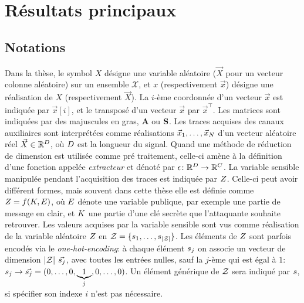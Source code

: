 \section{R\'{e}sultats principaux}\label{sec:res}

\subsection{Notations}
Dans la th\`{e}se, le symbol $X$ d\'{e}signe une variable al\'{e}atoire ($\vec{X}$ pour un vecteur colonne al\'{e}atoire) sur un ensemble $\mathcal{X}$, et $x$ (respectivement $\vec{x}$) d\'{e}signe une r\'{e}alisation de $X$ (respectivement $\vec{X}$). 
La $i$-\`{e}me coordonn\'{e}e d'un vecteur $\vec{x}$ est indiqu\'{e}e par $\vec{x}[i]$, et le transpos\'{e} d'un vecteur $\vec{x}$ par $\vec{x}^\intercal$. Les matrices sont indiqu\'{e}es par des majuscules en gras, $\textbf{A}$ ou $\textbf{S}$. Les traces acquises des canaux auxiliaires sont interpr\'{e}t\'{e}es comme r\'{e}alisations $\vec{x}_1, \dots , \vec{x}_N$ d'un vecteur al\'{e}atoire r\'{e}el $\vec{X}\in\mathbb{R}^D$, o\`{u} $D$ est la longueur du signal. Quand une m\'{e}thode de r\'{e}duction de dimension est utilis\'{e}e comme pr\'{e} traitement, celle-ci am\`{e}ne \`{a} la d\'{e}finition d'une fonction appel\'{e}e \emph{extracteur} et d\'{e}not\'{e} par $\epsilon \colon \mathbb{R}^D \rightarrow \mathbb{R}^C$. La variable sensible manipul\'{e}e pendant l'acquisition des traces est indiqu\'{e}e par $Z$. Celle-ci peut avoir diff\'{e}rent formes, mais souvent dans cette th\`{e}se elle est d\'{e}finie comme $Z = f(K,E)$, o\`{u} $E$ d\'{e}note une variable publique, par exemple une partie de message en clair, et $K$ une partie d'une cl\'{e} secr\`{e}te que l'attaquante souhaite retrouver. Les valeurs acquises par la variable sensible sont vus comme r\'{e}alisation de la variable al\'{e}atoire $Z$ en $\mathcal{Z} = \{s_{1}, \dots, s_{\lvert\mathcal{Z}\rvert}\}$. Les \'{e}l\'{e}ments de $Z$ sont parfois encod\'{e}s via le \emph{one-hot-encoding}: \`{a} chaque \'{e}l\'{e}ment $s_{j}$ on associe un vecteur de dimension $\lvert\mathcal{Z}\rvert$ $\vec{s_{j}}$, avec toutes les entr\'{e}es nulles, sauf la $j$-\`{e}me qui est \'{e}gal \`{a}  $1$: $s_{j}
\rightarrow \vec{s_{j}} = (0,\ldots , 0,\underbrace{1}_{j},0,\dots,0)$. Un \'{e}l\'{e}ment g\'{e}n\'{e}rique de $\mathcal{Z}$ sera indiqu\'{e} par $s$, si sp\'{e}cifier son indexe  $i$ n'est pas n\'{e}cessaire.

